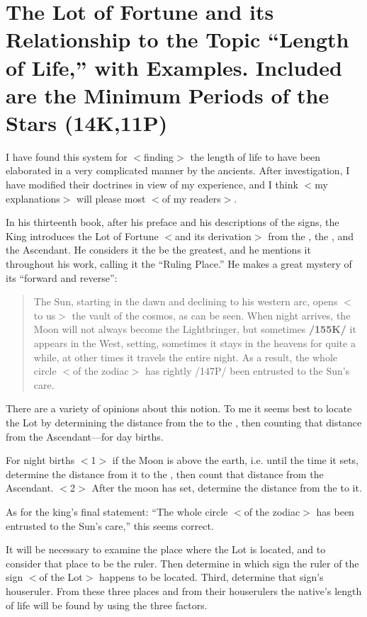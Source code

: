 \section{The Lot of Fortune and its Relationship to the Topic “Length of Life,” with Examples. Included are the Minimum Periods of the Stars (14K,11P)}

I have found this system for $<$finding$>$ the length of life to have been elaborated in a very complicated manner by the ancients. After investigation, I have modified their doctrines in view of my experience, and I think $<$my explanations$>$ will please most $<$of my readers$>$. 

In his thirteenth book, after his preface and his descriptions of the signs, the King introduces the Lot of Fortune $<$and its derivation$>$ from the \Sun, the \Moon, and the Ascendant. He considers it the be the greatest, and he mentions it throughout his work, calling it the “Ruling Place.” He makes a great mystery of its “forward and reverse”: 
\begin{quote}
The Sun, starting in the dawn and declining to his western arc, opens $<$to us$>$ the vault of the cosmos, as can be seen. When night arrives, the Moon will not always become the Lightbringer, but sometimes \textbf{/155K/} it appears in the West, setting, sometimes it stays in the heavens for quite a while, at other times it travels the entire night. As a result, the whole circle $<$of the zodiac$>$ has rightly /147P/ been entrusted to the Sun’s care.
\end{quote}

There are a variety of opinions about this notion. To me it seems best to locate the Lot by determining the distance from the \Sun\xspace to the \Moon, then counting that distance from the Ascendant—for day births. 

For night births $<$1$>$ if the Moon is above the earth, i.e. until the time it sets, determine the distance from it to the \Sun, then count that distance from the Ascendant. $<$2$>$ After the moon has set, determine the distance from the \Sun\xspace to it. 

As for the king’s final statement: “The whole circle $<$of the
zodiac$>$ has been entrusted to the Sun’s care,” this seems correct. 

It will be necessary to examine the place where the Lot is located, and to consider that place to be the ruler. Then determine in which sign the ruler of the sign $<$of the Lot$>$ happens to be located. Third, determine that sign’s houseruler. From these three places and from their houserulers the native’s length of life will be found by using the three factors.

